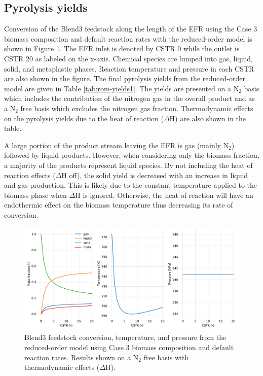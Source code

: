 \subsection{Pyrolysis yields}

Conversion of the Blend3 feedstock along the length of the EFR using the Case 3 biomass composition and default reaction rates with the reduced-order model is shown in Figure \ref{fig:rom-yields1}. The EFR inlet is denoted by CSTR 0 while the outlet is CSTR 20 as labeled on the x-axis. Chemical species are lumped into gas, liquid, solid, and metaplastic phases. Reaction temperature and pressure in each CSTR are also shown in the figure. The final pyrolysis yields from the reduced-order model are given in Table \ref{tab:rom-yields1}. The yields are presented on a N$_2$ basis which includes the contribution of the nitrogen gas in the overall product and as a N$_2$ free basis which excludes the nitrogen gas fraction. Thermodynamic effects on the pyrolysis yields due to the heat of reaction ($\Delta$H) are also shown in the table.

A large portion of the product stream leaving the EFR is gas (mainly N$_2$) followed by liquid products. However, when considering only the biomass fraction, a majority of the products represent liquid species. By not including the heat of reaction effects ($\Delta$H off), the solid yield is decreased with an increase in liquid and gas production. This is likely due to the constant temperature applied to the biomass phase when $\Delta$H is ignored. Otherwise, the heat of reaction will have an endothermic effect on the biomass temperature thus decreasing its rate of conversion.

\begin{figure}[H]
    \centering
    \includegraphics[width=\textwidth]{figures/rom-yields1.pdf}
    \caption{Blend3 feedstock conversion, temperature, and pressure from the reduced-order model using Case 3 biomass composition and default reaction rates. Results shown on a N$_2$ free basis with thermodynamic effects ($\Delta$H).}
    \label{fig:rom-yields1}
\end{figure}

